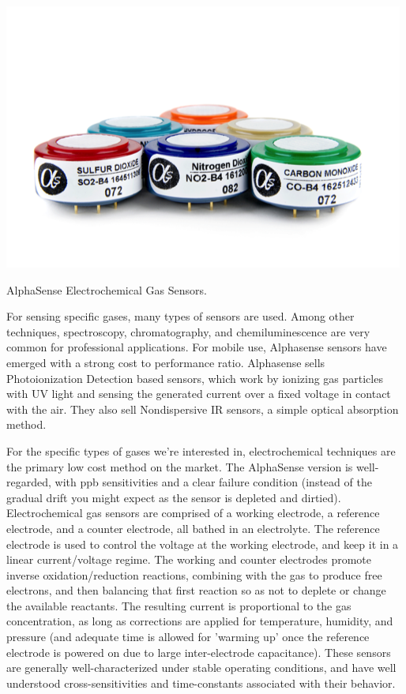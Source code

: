 \begin{marginfigure}[3.5cm]
 	\includegraphics[width=\textwidth]{visuals/as_gas}               
 	 \caption{AlphaSense Electrochemical Gas Sensors.}
  	\label{fig:as_gas}
\end{marginfigure}

For sensing specific gases, many types of sensors are used.  Among other techniques, spectroscopy, chromatography, and chemiluminescence are very common for professional applications.  For mobile use, Alphasense sensors have emerged with a strong cost to performance ratio.  Alphasense sells Photoionization Detection based sensors, which work by ionizing gas particles with UV light and sensing the generated current over a fixed voltage in contact with the air. They also sell Nondispersive IR sensors, a simple optical absorption method.  

For the specific types of gases we're interested in, electrochemical techniques are the primary low cost method on the market.  The AlphaSense version is well-regarded, with ppb sensitivities and a clear failure condition (instead of the gradual drift you might expect as the sensor is depleted and dirtied). Electrochemical gas sensors are comprised of a working electrode, a reference electrode, and a counter electrode, all bathed in an electrolyte.  The reference electrode is used to control the voltage at the working electrode, and keep it in a linear current/voltage regime.  The working and counter electrodes promote inverse oxidation/reduction reactions, combining with the gas to produce free electrons, and then balancing that first reaction so as not to deplete or change the available reactants. The resulting current is proportional to the gas concentration, as long as corrections are applied for temperature, humidity, and pressure (and adequate time is allowed for 'warming up' once the reference electrode is powered on due to large inter-electrode capacitance).  These sensors are generally well-characterized under stable operating conditions, and have well understood cross-sensitivities and time-constants associated with their behavior.

